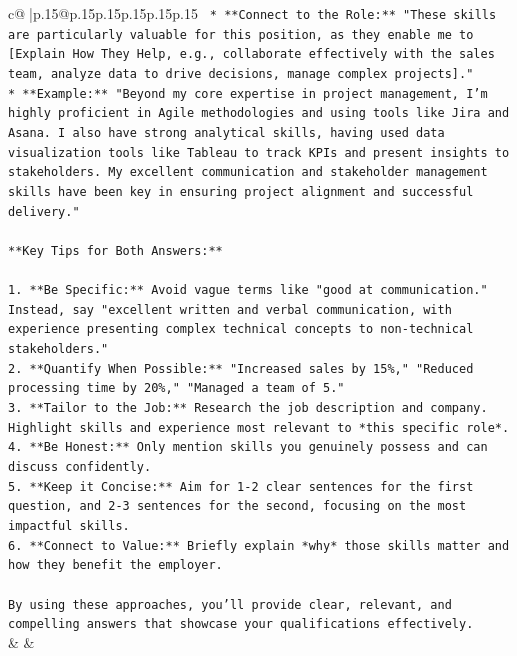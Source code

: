 \documentclass{article}
\begin{document}
{\begin{supertabular}{c@{$\;$}|p{.15\linewidth}@{}p{.15\linewidth}p{.15\linewidth}p{.15\linewidth}p{.15\linewidth}p{.15\linewidth}}
{{{\texttt{    *   **Connect to the Role:** "These skills are particularly valuable for this position, as they enable me to {[}Explain How They Help, e.g., collaborate effectively with the sales team, analyze data to drive decisions, manage complex projects{]}."} \\
\texttt{*   **Example:** "Beyond my core expertise in project management, I'm highly proficient in Agile methodologies and using tools like Jira and Asana. I also have strong analytical skills, having used data visualization tools like Tableau to track KPIs and present insights to stakeholders. My excellent communication and stakeholder management skills have been key in ensuring project alignment and successful delivery."} \\
\\ 
\texttt{**Key Tips for Both Answers:**} \\
\\ 
\texttt{1.  **Be Specific:** Avoid vague terms like "good at communication." Instead, say "excellent written and verbal communication, with experience presenting complex technical concepts to non{-}technical stakeholders."} \\
\texttt{2.  **Quantify When Possible:** "Increased sales by 15\%," "Reduced processing time by 20\%," "Managed a team of 5."} \\
\texttt{3.  **Tailor to the Job:** Research the job description and company. Highlight skills and experience most relevant to *this specific role*.} \\
\texttt{4.  **Be Honest:** Only mention skills you genuinely possess and can discuss confidently.} \\
\texttt{5.  **Keep it Concise:** Aim for 1{-}2 clear sentences for the first question, and 2{-}3 sentences for the second, focusing on the most impactful skills.} \\
\texttt{6.  **Connect to Value:** Briefly explain *why* those skills matter and how they benefit the employer.} \\
\\ 
\texttt{By using these approaches, you'll provide clear, relevant, and compelling answers that showcase your qualifications effectively.} \\
            }
        }
    }
    & & \\ \\


\end{supertabular}}
\end{document}
